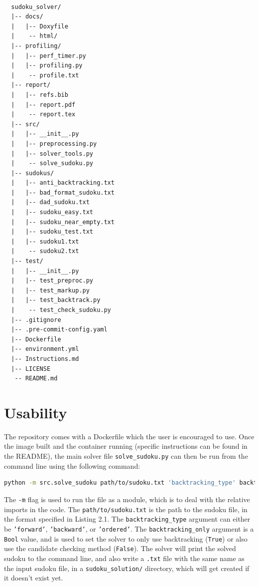 \documentclass[12pt]{report} %
\begin{document}
\begin{lstlisting}[caption={Directory Structure},basicstyle=\tiny]

  sudoku_solver/
  |-- docs/
  |   |-- Doxyfile
  |    -- html/
  |-- profiling/
  |   |-- perf_timer.py
  |   |-- profiling.py
  |    -- profile.txt
  |-- report/
  |   |-- refs.bib
  |   |-- report.pdf
  |    -- report.tex
  |-- src/
  |   |-- __init__.py
  |   |-- preprocessing.py
  |   |-- solver_tools.py
  |    -- solve_sudoku.py
  |-- sudokus/
  |   |-- anti_backtracking.txt
  |   |-- bad_format_sudoku.txt
  |   |-- dad_sudoku.txt
  |   |-- sudoku_easy.txt
  |   |-- sudoku_near_empty.txt
  |   |-- sudoku_test.txt
  |   |-- sudoku1.txt
  |    -- sudoku2.txt
  |-- test/
  |   |-- __init__.py
  |   |-- test_preproc.py
  |   |-- test_markup.py
  |   |-- test_backtrack.py
  |    -- test_check_sudoku.py
  |-- .gitignore
  |-- .pre-commit-config.yaml
  |-- Dockerfile
  |-- environment.yml
  |-- Instructions.md
  |-- LICENSE
   -- README.md

\end{lstlisting}

\section{Usability}

The repository comes with a Dockerfile which the user is encouraged to use. Once the image built and the container running (specific instructions can be found in the README), the main solver file \texttt{solve\_sudoku.py} can then be run from the command line using the following command:

\begin{lstlisting}[language=bash, caption={How to run the solver}]
  python -m src.solve_sudoku path/to/sudoku.txt 'backtracking_type' backtracking_only
\end{lstlisting}

The \texttt{-m} flag is used to run the file as a module, which is to deal with the relative imports in the code. The \texttt{path/to/sudoku.txt} is the path to the sudoku file, in the format specified in Listing 2.1. The \texttt{backtracking\_type} argument can either be \texttt{'forward'}, \texttt{'backward'}, or \texttt{'ordered'}. The \texttt{backtracking\_only} argument is a \texttt{Bool} value, and is used to set the solver to only use backtracking (\texttt{True}) or also use the candidate checking method (\texttt{False}). The solver will print the solved sudoku to the command line, and also write a \texttt{.txt} file with the same name as the input sudoku file, in a \texttt{sudoku\_solution/} directory, which will get created if it doesn't exist yet.
\end{document}
